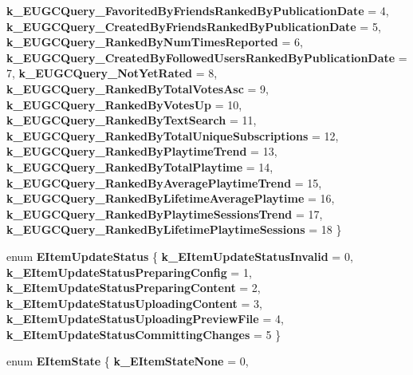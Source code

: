 \begin{DoxyCompactItemize}
\newline
{\bfseries k\+\_\+\+E\+U\+G\+C\+Query\+\_\+\+Favorited\+By\+Friends\+Ranked\+By\+Publication\+Date} = 4, 
{\bfseries k\+\_\+\+E\+U\+G\+C\+Query\+\_\+\+Created\+By\+Friends\+Ranked\+By\+Publication\+Date} = 5, 
{\bfseries k\+\_\+\+E\+U\+G\+C\+Query\+\_\+\+Ranked\+By\+Num\+Times\+Reported} = 6, 
{\bfseries k\+\_\+\+E\+U\+G\+C\+Query\+\_\+\+Created\+By\+Followed\+Users\+Ranked\+By\+Publication\+Date} = 7, 
\newline
{\bfseries k\+\_\+\+E\+U\+G\+C\+Query\+\_\+\+Not\+Yet\+Rated} = 8, 
{\bfseries k\+\_\+\+E\+U\+G\+C\+Query\+\_\+\+Ranked\+By\+Total\+Votes\+Asc} = 9, 
{\bfseries k\+\_\+\+E\+U\+G\+C\+Query\+\_\+\+Ranked\+By\+Votes\+Up} = 10, 
{\bfseries k\+\_\+\+E\+U\+G\+C\+Query\+\_\+\+Ranked\+By\+Text\+Search} = 11, 
\newline
{\bfseries k\+\_\+\+E\+U\+G\+C\+Query\+\_\+\+Ranked\+By\+Total\+Unique\+Subscriptions} = 12, 
{\bfseries k\+\_\+\+E\+U\+G\+C\+Query\+\_\+\+Ranked\+By\+Playtime\+Trend} = 13, 
{\bfseries k\+\_\+\+E\+U\+G\+C\+Query\+\_\+\+Ranked\+By\+Total\+Playtime} = 14, 
{\bfseries k\+\_\+\+E\+U\+G\+C\+Query\+\_\+\+Ranked\+By\+Average\+Playtime\+Trend} = 15, 
\newline
{\bfseries k\+\_\+\+E\+U\+G\+C\+Query\+\_\+\+Ranked\+By\+Lifetime\+Average\+Playtime} = 16, 
{\bfseries k\+\_\+\+E\+U\+G\+C\+Query\+\_\+\+Ranked\+By\+Playtime\+Sessions\+Trend} = 17, 
{\bfseries k\+\_\+\+E\+U\+G\+C\+Query\+\_\+\+Ranked\+By\+Lifetime\+Playtime\+Sessions} = 18
 \}
\item 
\mbox{\label{namespace_valve_1_1_steamworks_a4bcf5422890768c204271d392121fd6e}} 
enum {\bfseries E\+Item\+Update\+Status} \{ \newline
{\bfseries k\+\_\+\+E\+Item\+Update\+Status\+Invalid} = 0, 
{\bfseries k\+\_\+\+E\+Item\+Update\+Status\+Preparing\+Config} = 1, 
{\bfseries k\+\_\+\+E\+Item\+Update\+Status\+Preparing\+Content} = 2, 
{\bfseries k\+\_\+\+E\+Item\+Update\+Status\+Uploading\+Content} = 3, 
\newline
{\bfseries k\+\_\+\+E\+Item\+Update\+Status\+Uploading\+Preview\+File} = 4, 
{\bfseries k\+\_\+\+E\+Item\+Update\+Status\+Committing\+Changes} = 5
 \}
\item 
\mbox{\label{namespace_valve_1_1_steamworks_a8b19e4b9db4059e82e46a211084bc98f}} 
enum {\bfseries E\+Item\+State} \{ \newline
{\bfseries k\+\_\+\+E\+Item\+State\+None} = 0, 

\end{DoxyCompactItemize}
